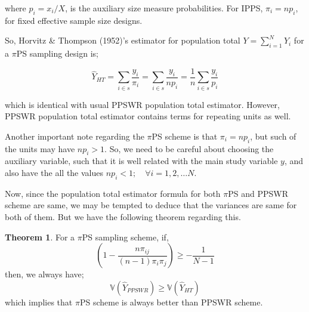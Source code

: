 \documentclass[12pt]{article}
\newcommand{\Var}{\mathbb{V}}
\theoremstyle{definition}
\newtheorem{thm}{Theorem}
\newenvironment{theorem}{
\begin{tcolorbox}[colback=green!5!white,colframe=green!75!black, parbox = false]\begin{thm} }{\end{thm}\end{tcolorbox} }
\begin{document}
where $p_i = x_i/X$, is the auxiliary size measure probabilities. For IPPS, $\pi_i = n p_i$, for fixed effective sample size designs.

So, Horvitz \& Thompson (1952)'s estimator for population total $Y = \sum_{i=1}^N Y_i$ for a $\pi$PS sampling design is;

$$\hat{Y}_{HT} = \sum_{i \in s} \dfrac{y_i}{\pi_i} = \sum_{i \in s} \dfrac{y_i}{np_i} = \dfrac{1}{n} \sum_{i \in s} \dfrac{y_i}{p_i}$$

which is identical with usual PPSWR population total estimator. However, PPSWR population total estimator contains terms for repeating units as well.

Another important note regarding the $\pi$PS scheme is that $\pi_i = np_i$, but such of the units may have $np_i > 1$. So, we need to be careful about choosing the auxiliary variable, such that it is well related with the main study variable $y$, and also have the all the values $np_i < 1; \quad \forall i = 1, 2, \dots N$.

Now, since the population total estimator formula for both $\pi$PS and PPSWR scheme are same, we may be tempted to deduce that the variances are same for both of them. But we have the following theorem regarding this.

\begin{theorem}
    For a $\pi$PS sampling scheme, if,
    $$\left( 1 - \dfrac{n \pi_{ij}}{(n-1)\pi_i \pi_j} \right) \geq -\dfrac{1}{N-1} $$
    then, we always have;
    $$\Var(\hat{Y}_{PPSWR}) \geq \Var(\hat{Y}_{HT})$$
    which implies that $\pi$PS scheme is always better than PPSWR scheme.
\end{theorem}
\end{document}
